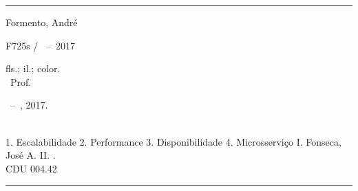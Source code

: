 %
%     
\begin{fichacatalografica}
	\vspace*{\fill}					%
	\hrule							%
	\begin{center}					%
	\begin{minipage}[c]{12.5cm}		%

	Formento, André

    \hspace{-1.4cm} F725s
    \hspace{0.79cm} \imprimirtitulo  / \imprimirautor~--~2017

    \hspace{0.5cm} \cfoot{{\hypersetup{linkcolor=black}\pageref{LastPage}}}fls.; il.; color.\\

	\hspace{0.5cm} \imprimirorientadorRotulo~Prof. \imprimirorientador\\

	\hspace{0.5cm} \parbox[t]{\textwidth}{\imprimirtipotrabalho~--~\imprimirinstituicao, 2017.}\\

	\hspace{0.5cm}
		1. Escalabilidade
		2. Performance
		3. Disponibilidade
		4. Microsserviço
		I. Fonseca, José A.
		II. \imprimirtitulo.\\

	\hspace{8.75cm} CDU 004.42\\

	\end{minipage}
	\end{center}
	\hrule
\end{fichacatalografica}
